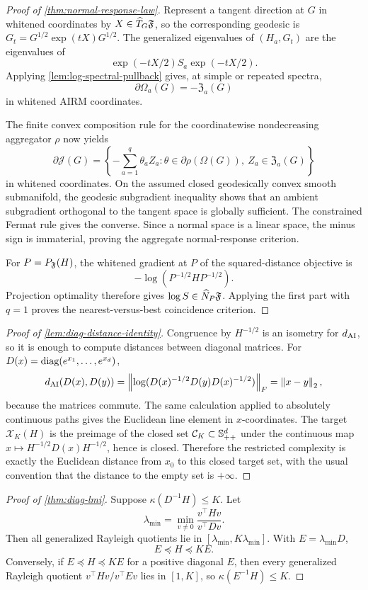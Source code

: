 \begin{proof}[Proof of \cref{thm:normal-response-law}]
Represent a tangent direction at \(G\) in whitened coordinates by
\(X\in\widehat T_G\mathfrak F\), so the corresponding geodesic is
\(G_t=G^{1/2}\exp(tX)G^{1/2}\).  The generalized eigenvalues of
\((H_a,G_t)\) are the eigenvalues of
\[
  \exp(-tX/2)S_a\exp(-tX/2).
\]
Applying \cref{lem:log-spectral-pullback} gives, at simple or repeated spectra,
\[
  \partial\Omega_a(G)=-\mathfrak Z_a(G)
\]
in whitened AIRM coordinates.

The finite convex composition rule for the coordinatewise nondecreasing
aggregator \(\rho\) now yields
\[
  \partial\mathcal J(G)
  =
  \left\{-\sum_{a=1}^q\theta_aZ_a:
  \theta\in\partial\rho(\Omega(G)),\
  Z_a\in\mathfrak Z_a(G)\right\}
\]
in whitened coordinates.  On the assumed closed geodesically convex smooth
submanifold, the geodesic subgradient inequality shows that an ambient
subgradient orthogonal to the tangent space is globally sufficient.  The
constrained Fermat rule gives the converse.  Since a normal space is a linear
space, the minus sign is immaterial, proving the aggregate normal-response
criterion.

For \(P=P_\mathfrak F(H)\), the whitened gradient at \(P\) of the squared-distance
objective is
\[
  -\log(P^{-1/2}HP^{-1/2}).
\]
Projection optimality therefore gives
\(\log S\in\widehat N_P\mathfrak F\). Applying the first part with \(q=1\) proves the
nearest-versus-best coincidence criterion.
\end{proof}

\begin{proof}[Proof of \cref{lem:diag-distance-identity}]
Congruence by \(H^{-1/2}\) is an isometry for \(d_{\mathrm{AI}}\), so it is enough to
compute distances between diagonal matrices. For
\(D(x)=\operatorname{diag}(e^{x_1},\ldots,e^{x_d})\),
\[
  d_{\mathrm{AI}}(D(x),D(y))
  =
  \left\lVert \log(D(x)^{-1/2}D(y)D(x)^{-1/2})\right\rVert_F
  =
  \left\lVert x-y\right\rVert_2,
\]
because the matrices commute. The same calculation applied to absolutely
continuous paths gives the Euclidean line element in \(x\)-coordinates. The
target \(\mathcal X_K(H)\) is the preimage of the closed set
\(\mathcal C_K\subset\mathbb S_{++}^d\) under the continuous map
\(x\mapsto H^{-1/2}D(x)H^{-1/2}\), hence is closed. Therefore the restricted
complexity is exactly the Euclidean distance from \(x_0\) to this closed target
set, with the usual convention that the distance to the empty set is
\(+\infty\).
\end{proof}

\begin{proof}[Proof of \cref{thm:diag-lmi}]
Suppose \(\kappa(D^{-1}H)\le K\). Let
\[
  \lambda_{\min}=\min_{v\ne0}\frac{v^\top Hv}{v^\top Dv}.
\]
Then all generalized Rayleigh quotients lie in
\([\lambda_{\min},K\lambda_{\min}]\). With \(E=\lambda_{\min}D\),
\[
  E\preceq H\preceq K E.
\]
Conversely, if \(E\preceq H\preceq KE\) for a positive diagonal \(E\), then
every generalized Rayleigh quotient \(v^\top Hv/v^\top Ev\) lies in
\([1,K]\), so \(\kappa(E^{-1}H)\le K\).
\end{proof}


